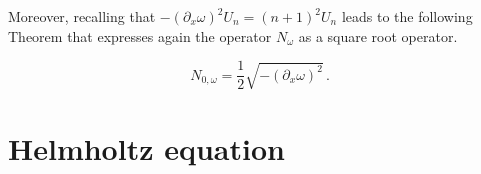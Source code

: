 \documentclass[a4paper]{subfiles}
\begin{document}
Moreover, recalling that $-(\partial_x\omega)^2 U_n = (n+1)^2 U_n$ leads to the following Theorem that expresses
again the operator $N_\omega$ as a square root operator.
\begin{theorem} 
	\label{the:NeumannInverseLaplace}
	\begin{equation}
	N_{0,\omega} = \frac12\sqrt{-(\partial_x \omega)^{2}}\,.
	\end{equation}
\end{theorem}
%
\section{Helmholtz equation}
	
\end{document}
